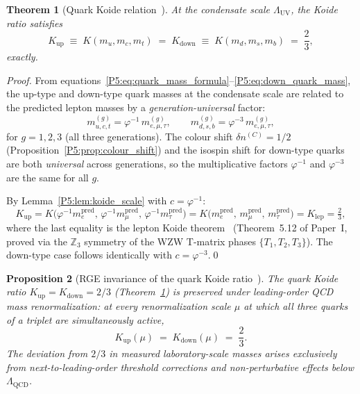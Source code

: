 \documentclass[11pt,a4paper]{article}
\newtheorem{theorem}{Theorem}[section]
\newtheorem{proposition}[theorem]{Proposition}
\theoremstyle{definition}
\theoremstyle{remark}
\newcommand{\vp}{\varphi}
\newcommand{\LUV}{\Lambda_{\mathrm{UV}}}
\begin{document}
\begin{theorem}[Quark Koide relation~\cite{Koide1983}]
\label{P5:thm:quark_koide}
At the condensate scale $\LUV$, the Koide ratio satisfies
\begin{equation}
  K_{\mathrm{up}} \;\equiv\; K(m_u,m_c,m_t)
  \;=\; K_{\mathrm{down}} \;\equiv\; K(m_d,m_s,m_b)
  \;=\; \frac{2}{3},
  \label{P5:eq:quark_koide}
\end{equation}
\emph{exactly}.
\end{theorem}
\begin{proof}
From equations~\eqref{P5:eq:quark_mass_formula}--\eqref{P5:eq:down_quark_mass},
the up-type and down-type quark masses at the condensate scale are
related to the predicted lepton masses by a \emph{generation-universal} factor:
\begin{equation}
  m_{u,c,t}^{(g)} = \vp^{-1}\,m_{e,\mu,\tau}^{(g)}, \qquad
  m_{d,s,b}^{(g)} = \vp^{-3}\,m_{e,\mu,\tau}^{(g)},
  \label{P5:eq:quark_lepton_factor}
\end{equation}
for $g=1,2,3$ (all three generations).  The colour shift $\delta n^{(C)}=1/2$
(Proposition~\ref{P5:prop:colour_shift}) and the isospin shift for down-type quarks
are both \emph{universal} across generations, so the multiplicative factors
$\vp^{-1}$ and $\vp^{-3}$ are the same for all $g$.

By Lemma~\ref{P5:lem:koide_scale} with $c=\vp^{-1}$:
\[
  K_{\mathrm{up}}
  = K\!\bigl(\vp^{-1}m_e^{\mathrm{pred}},\,\vp^{-1}m_\mu^{\mathrm{pred}},\,
    \vp^{-1}m_\tau^{\mathrm{pred}}\bigr)
  = K\!\bigl(m_e^{\mathrm{pred}},\,m_\mu^{\mathrm{pred}},\,m_\tau^{\mathrm{pred}}\bigr)
  = K_{\mathrm{lep}} = \tfrac{2}{3},
\]
where the last equality is the lepton Koide theorem~\cite{Paper1}
(Theorem~5.12 of Paper~I, proved via the $\mathbb{Z}_3$ symmetry of
the WZW T-matrix phases $\{T_1,T_2,T_3\}$).
The down-type case follows identically with $c=\vp^{-3}$.\qed
\end{proof}

\begin{proposition}[RGE invariance of the quark Koide ratio~\cite{Koide1983}]
\label{P5:prop:koide_rge}
The quark Koide ratio $K_{\mathrm{up}}=K_{\mathrm{down}}=2/3$
(Theorem~\ref{P5:thm:quark_koide}) is preserved under leading-order
QCD mass renormalization: at every renormalization scale $\mu$ at
which all three quarks of a triplet are simultaneously active,
\begin{equation}
  K_{\mathrm{up}}(\mu) \;=\; K_{\mathrm{down}}(\mu) \;=\; \frac{2}{3}.
  \label{P5:eq:koide_rge_inv}
\end{equation}
The deviation from $2/3$ in measured laboratory-scale masses arises
exclusively from next-to-leading-order threshold corrections
and non-perturbative effects below $\Lambda_{\mathrm{QCD}}$.
\end{proposition}
\end{document}
